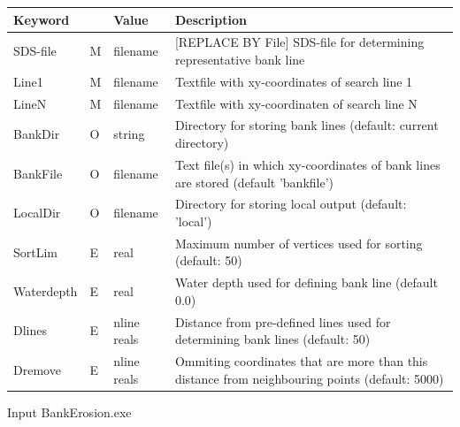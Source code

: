 \begin{tabular}{lllp{5cm}}
Keyword &  & Value & Description \\ \hline
SDS-file & M & filename & [REPLACE BY File] SDS-file for determining representative bank line \\
Line1    & M & filename & Textfile with xy-coordinates of search line 1 \\
LineN    & M & filename & Textfile with xy-coordinaten of search line N \\
BankDir & O & string & Directory for storing bank lines (default: current directory) \\
BankFile & O & filename & Text file(s) in which xy-coordinates of bank lines are stored (default 'bankfile') \\
LocalDir & O & filename & Directory for storing local output (default: 'local') \\
SortLim & E & real & Maximum number of vertices used for sorting (default: 50) \\
Waterdepth & E & real & Water depth used for defining bank line (default 0.0) \\
Dlines & E & nline reals & Distance from pre-defined lines used for determining bank lines (default: 50) \\
Dremove & E & nline reals & Ommiting coordinates that are more than this distance from neighbouring points (default: 5000) \\ \hline
\end{tabular}

Input BankErosion.exe

